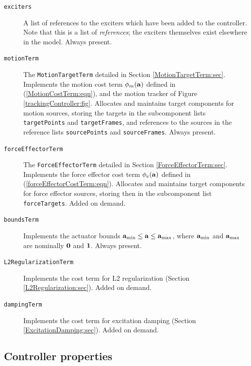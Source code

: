 \begin{description}

\item[\tt exciters]\mbox{}

A list of references to the exciters which have been added to the controller.
Note that this is a list of {\it references}; the exciters themselves exist
elsewhere in the model. Always present.

\item[\tt motionTerm]\mbox{}

The {\tt MotionTargetTerm} detailed in Section \ref{MotionTargetTerm:sec}.
Implements the motion cost term $\phi_m({\bf a})$ defined in
(\ref{MotionCostTerm:eqn}), and the motion tracker of
Figure \ref{trackingController:fig}.  Allocates and maintains target components
for motion sources, storing the targets in the subcomponent lists {\tt
targetPoints} and {\tt targetFrames}, and references to the sources in the
reference lists {\tt sourcePoints} and {\tt sourceFrames}. Always present.

\item[\tt forceEffectorTerm]\mbox{}

The {\tt ForceEffectorTerm} detailed in Section \ref{ForceEffectorTerm:sec}.
Implements the force effector cost term $\phi_e({\bf a})$ defined in
(\ref{forceEffectorCostTerm:eqn}).  Allocates and maintains target components
for force effector sources, storing then in the subcomponent list {\tt
forceTargets}. Added on demand.

\item[\tt boundsTerm]\mbox{}

Implements the actuator bounds ${\bf a}_\text{min} \le {\bf a} \le {\bf a}_\text{max}$,
where ${\bf a}_\text{min}$ and ${\bf a}_\text{max}$ are nominally $\bf 0$
and $\bf 1$. Always present.

\item[\tt L2RegularizationTerm]\mbox{}

Implements the cost term for L2 regularization
(Section \ref{L2Regularization:sec}). Added on demand.

\item[\tt dampingTerm]\mbox{}

Implements the cost term for excitation damping
(Section \ref{ExcitationDamping:sec}). Added on demand.

\end{description}

\subsection{Controller properties}
\label{ControllerProperties:sec}

